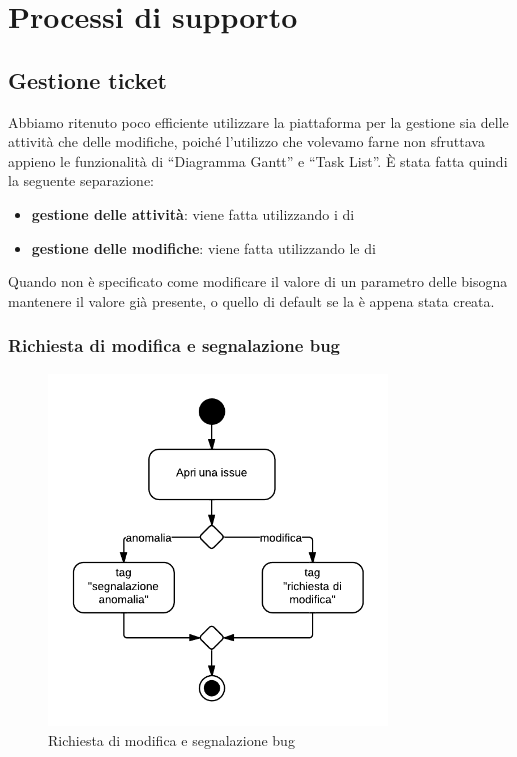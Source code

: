 \section{Processi di supporto}

\subsection{Gestione ticket}
\label{gestioneticket}

Abbiamo ritenuto poco efficiente utilizzare la piattaforma  per la gestione sia delle attività che delle modifiche, poiché l'utilizzo che volevamo farne non sfruttava appieno le funzionalità di ``Diagramma Gantt'' e ``Task List''. È stata fatta quindi la seguente separazione:
\begin{itemize}
 \item \textbf{gestione delle attività}: viene fatta utilizzando i  di 
 \item \textbf{gestione delle modifiche}: viene fatta utilizzando le  di 
\end{itemize}

Quando non è specificato come modificare il valore di un parametro delle  bisogna mantenere il valore già presente, o quello di default se la  è appena stata creata.

\subsubsection{Richiesta di modifica e segnalazione bug}
\label{aperturaissue}

\begin{figure}[H]
    \centering
    \includegraphics[width=9cm]{uml-processi/richiesta_di_modifica_e_segnalazione_bug.png}
    \caption{Richiesta di modifica e segnalazione bug}
\end{figure}

